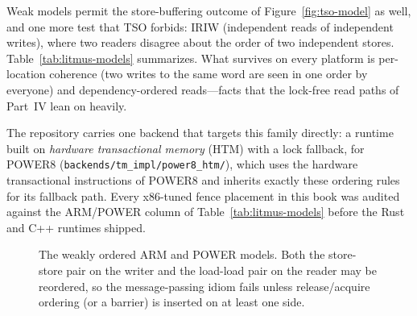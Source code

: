 Weak models permit the store-buffering outcome of
Figure~\ref{fig:tso-model} as well, and one more test that TSO forbids:
IRIW (independent reads of independent writes), where two readers
disagree about the order of two independent stores. Table~\ref{tab:litmus-models}
summarizes. What survives on every platform is per-location coherence
(two writes to the same word are seen in one order by everyone) and
dependency-ordered reads---facts that the lock-free read paths of
Part~IV lean on heavily.

The repository carries one backend that targets this family directly:
a runtime built on \emph{hardware transactional memory} (HTM) with a
lock fallback, for POWER8
(\texttt{backends/tm\_impl/power8\_htm/}), which uses the hardware
transactional instructions of
POWER8 and inherits exactly these ordering rules for its fallback path.
Every x86-tuned fence placement in this book was audited against the
ARM/POWER column of Table~\ref{tab:litmus-models} before the Rust and C++
runtimes shipped.

\begin{figure}[htbp]
\centering
{}
\caption{The weakly ordered ARM and POWER models. Both the store-store
pair on the writer and the load-load pair on the reader may be reordered,
so the message-passing idiom fails unless release/acquire ordering (or a
barrier) is inserted on at least one side.}
\label{fig:weak-model}
\end{figure}

